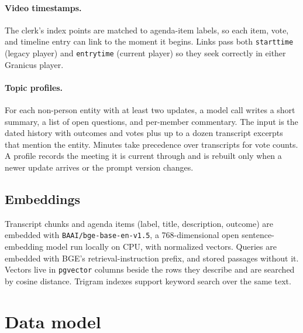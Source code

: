 \documentclass[11pt]{article}
\newcommand{\code}[1]{\texttt{#1}}
\begin{document}
\paragraph{Video timestamps.} The clerk's index points are matched to agenda-item labels,
so each item, vote, and timeline entry can link to the moment it begins. Links pass both
\code{starttime} (legacy player) and \code{entrytime} (current player) so they seek
correctly in either Granicus player.

\paragraph{Topic profiles.} For each non-person entity with at least two updates, a
model call writes a short summary, a list of open questions, and per-member commentary.
The input is the dated history with outcomes and votes plus up to a dozen transcript
excerpts that mention the entity. Minutes take precedence over transcripts for vote
counts. A profile records the meeting it is current through and is rebuilt only when a
newer update arrives or the prompt version changes.

\subsection{Embeddings}

Transcript chunks and agenda items (label, title, description, outcome) are embedded with
\code{BAAI/bge-base-en-v1.5}, a 768-dimensional open sentence-embedding model run locally
on CPU, with normalized vectors. Queries are embedded with BGE's retrieval-instruction
prefix, and stored passages without it. Vectors live in \code{pgvector} columns beside the
rows they describe and are searched by cosine distance. Trigram indexes support keyword
search over the same text.

\section{Data model}
\end{document}

